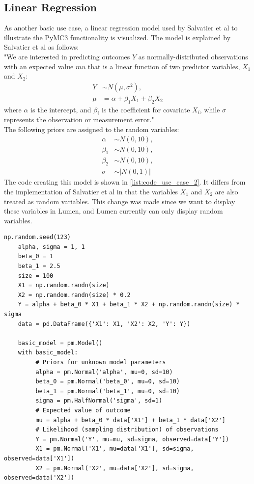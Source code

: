 \documentclass{article}
\begin{document}
\subsection{Linear Regression}
\label{subsec:linreg}
As another basic use case, a linear regression model used by Salvatier et al to illustrate the PyMC3 functionality \cite{Salvatier2016} is visualized. 
The model is explained by Salvatier et al as follows:\\
"We are interested in predicting outcomes $Y$ as normally-distributed observations with an expected value $mu$ that is a linear function of two predictor variables, $X_1$ and $X_2$:
\begin{equation}
\begin{split}
Y &\sim N(\mu,\sigma^2), \\
\mu &= \alpha + \beta_1 X_1 + \beta_2 X_2
\end{split}
\end{equation}
where $\alpha$ is the intercept, and $\beta_i$ is the coefficient for covariate $X_i$, while $\sigma$ represents the observation or measurement error."\\
The following priors are assigned to the random variables:
\begin{equation}
\begin{split}
\alpha &\sim N(0,10), \\
\beta_1 &\sim N(0,10), \\
\beta_2 &\sim N(0,10), \\
\sigma &\sim |N(0,1)|
\end{split}
\end{equation}
The code creating this model is shown in \autoref{list:code_use_case_2}. It differs from the implementation of Salvatier et al in that the variables $X_1$ and $X_2$ are also treated as random variables. This change was made since we want to display these variables in Lumen, and Lumen currently can only display random variables.
\begin{lstlisting}[caption={PyMC3 model of linear regression example}, label={list:code_use_case_2},captionpos=b]
    np.random.seed(123)
    alpha, sigma = 1, 1
    beta_0 = 1
    beta_1 = 2.5
    size = 100
    X1 = np.random.randn(size)
    X2 = np.random.randn(size) * 0.2
    Y = alpha + beta_0 * X1 + beta_1 * X2 + np.random.randn(size) * sigma
    data = pd.DataFrame({'X1': X1, 'X2': X2, 'Y': Y})
	
    basic_model = pm.Model()
    with basic_model:
         # Priors for unknown model parameters
         alpha = pm.Normal('alpha', mu=0, sd=10)
         beta_0 = pm.Normal('beta_0', mu=0, sd=10)
         beta_1 = pm.Normal('beta_1', mu=0, sd=10)
         sigma = pm.HalfNormal('sigma', sd=1)
         # Expected value of outcome 
         mu = alpha + beta_0 * data['X1'] + beta_1 * data['X2']
         # Likelihood (sampling distribution) of observations
         Y = pm.Normal('Y', mu=mu, sd=sigma, observed=data['Y'])
         X1 = pm.Normal('X1', mu=data['X1'], sd=sigma, observed=data['X1'])
         X2 = pm.Normal('X2', mu=data['X2'], sd=sigma, observed=data['X2'])
\end{lstlisting}
\end{document}
